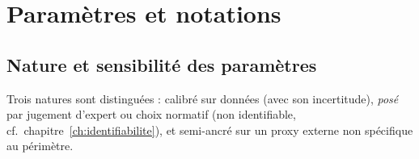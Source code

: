 
%
%
%
%

\chapter{Paramètres et notations}
\label{sec:ann-parametres}

\section{Nature et sensibilité des paramètres}

Trois natures sont distinguées : calibré sur données (avec son incertitude),
\emph{posé} par jugement d'expert ou choix normatif (non identifiable, cf.\
chapitre~\ref{ch:identifiabilite}), et semi-ancré sur un proxy externe non
spécifique au périmètre.

